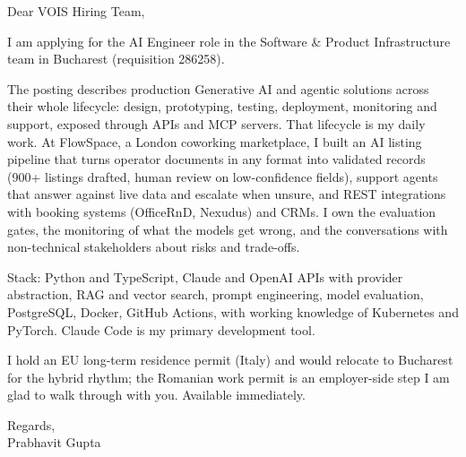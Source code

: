 \documentclass[a4paper,11pt]{article}
\begin{document}
Dear VOIS Hiring Team,

I am applying for the AI Engineer role in the Software \& Product Infrastructure team in Bucharest (requisition 286258).

The posting describes production Generative AI and agentic solutions across their whole lifecycle: design, prototyping, testing, deployment, monitoring and support, exposed through APIs and MCP servers. That lifecycle is my daily work. At FlowSpace, a London coworking marketplace, I built an AI listing pipeline that turns operator documents in any format into validated records (900+ listings drafted, human review on low-confidence fields), support agents that answer against live data and escalate when unsure, and REST integrations with booking systems (OfficeRnD, Nexudus) and CRMs. I own the evaluation gates, the monitoring of what the models get wrong, and the conversations with non-technical stakeholders about risks and trade-offs.

Stack: Python and TypeScript, Claude and OpenAI APIs with provider abstraction, RAG and vector search, prompt engineering, model evaluation, PostgreSQL, Docker, GitHub Actions, with working knowledge of Kubernetes and PyTorch. Claude Code is my primary development tool.

I hold an EU long-term residence permit (Italy) and would relocate to Bucharest for the hybrid rhythm; the Romanian work permit is an employer-side step I am glad to walk through with you. Available immediately.

Regards,\\
Prabhavit Gupta
\end{document}

